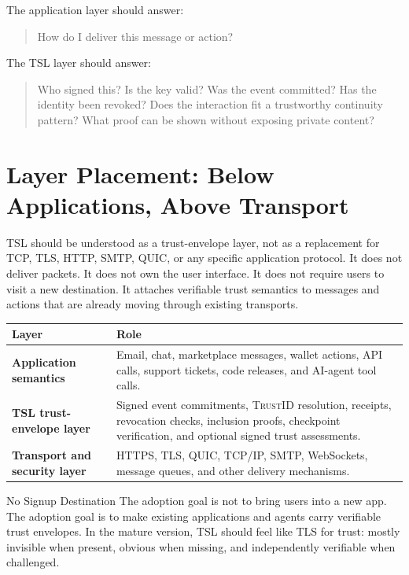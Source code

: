 \documentclass[11pt]{article}
\newcommand{\TSL}{\textsc{TSL}}
\newcommand{\TrustID}{\textsc{TrustID}}
\begin{document}
The application layer should answer:

\begin{quote}
How do I deliver this message or action?
\end{quote}

The \TSL{} layer should answer:

\begin{quote}
Who signed this? Is the key valid? Was the event committed? Has the identity been revoked? Does the interaction fit a trustworthy continuity pattern? What proof can be shown without exposing private content?
\end{quote}


\section{Layer Placement: Below Applications, Above Transport}

\TSL{} should be understood as a trust-envelope layer, not as a replacement for TCP, TLS, HTTP, SMTP, QUIC, or any specific application protocol. It does not deliver packets. It does not own the user interface. It does not require users to visit a new destination. It attaches verifiable trust semantics to messages and actions that are already moving through existing transports.

\begin{center}
\begin{tabularx}{\textwidth}{>{\bfseries}p{} X}
\toprule
Layer & Role \\
\midrule
Application semantics & Email, chat, marketplace messages, wallet actions, API calls, support tickets, code releases, and AI-agent tool calls. \\
\TSL{} trust-envelope layer & Signed event commitments, \TrustID{} resolution, receipts, revocation checks, inclusion proofs, checkpoint verification, and optional signed trust assessments. \\
Transport and security layer & HTTPS, TLS, QUIC, TCP/IP, SMTP, WebSockets, message queues, and other delivery mechanisms. \\
\bottomrule
\end{tabularx}
\end{center}

\begin{principlebox}{No Signup Destination}
The adoption goal is not to bring users into a new app. The adoption goal is to make existing applications and agents carry verifiable trust envelopes. In the mature version, \TSL{} should feel like TLS for trust: mostly invisible when present, obvious when missing, and independently verifiable when challenged.
\end{principlebox}
\end{document}
